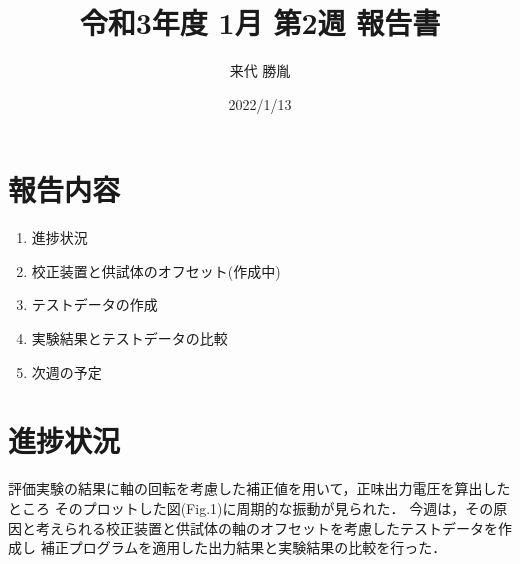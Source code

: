 \documentclass[twocolumn,a4j]{jsarticle}
\author{来代 勝胤}
\title{令和3年度 1月 第2週 報告書}
\date{2022/1/13}
\begin{document}
\columnseprule=0.1mm

\maketitle
\section*{報告内容}
\begin{enumerate}[1.]
    \item 進捗状況
    \item 校正装置と供試体のオフセット(作成中)
    \item テストデータの作成
    \item 実験結果とテストデータの比較
    \item 次週の予定
\end{enumerate}

\section{進捗状況}
評価実験の結果に軸の回転を考慮した補正値を用いて，正味出力電圧を算出したところ
そのプロットした図(Fig.1)に周期的な振動が見られた．
今週は，その原因と考えられる校正装置と供試体の軸のオフセットを考慮したテストデータを作成し
補正プログラムを適用した出力結果と実験結果の比較を行った．





\end{document}
